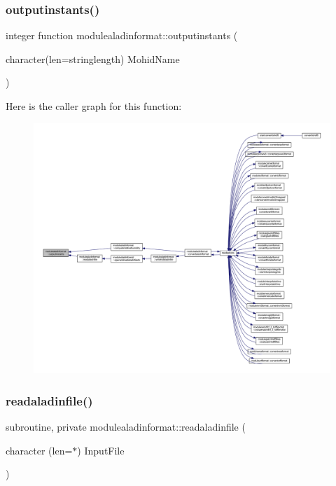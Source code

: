 \subsubsection{\texorpdfstring{outputinstants()}{outputinstants()}}
{\footnotesize\ttfamily integer function modulealadinformat\+::outputinstants (\begin{DoxyParamCaption}\item[{character(len=stringlength)}]{Mohid\+Name }\end{DoxyParamCaption})\hspace{0.3cm}{\ttfamily [private]}}

Here is the caller graph for this function\+:\nopagebreak
\begin{figure}[H]
\begin{center}
\leavevmode
\includegraphics[width=350pt]{namespacemodulealadinformat_aa8356f98f813a0fe5edb9089053dc372_icgraph}
\end{center}
\end{figure}
\mbox{\label{namespacemodulealadinformat_a01a53a6349fe1f7a1e5973e60abcf19d}} 
\subsubsection{\texorpdfstring{readaladinfile()}{readaladinfile()}}
{\footnotesize\ttfamily subroutine, private modulealadinformat\+::readaladinfile (\begin{DoxyParamCaption}\item[{character (len=$\ast$)}]{Input\+File }\end{DoxyParamCaption})\hspace{0.3cm}{\ttfamily [private]}}

